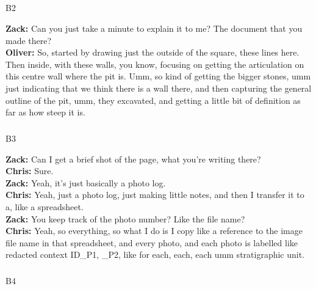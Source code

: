\documentclass[
]{article}
\makeatletter
\let\oldsubparagraph\subparagraph
\renewcommand{\subparagraph}{
    \@ifstar
      \xxxSubParagraphStar
      \xxxSubParagraphNoStar
  }
\newcommand{\xxxSubParagraphStar}[1]{\oldsubparagraph*{#1}\mbox{}}
\newcommand{\xxxSubParagraphNoStar}[1]{\oldsubparagraph{#1}\mbox{}}
\makeatother
\begin{document}
\subparagraph{B2}\label{sec-B2}

\textbf{Zack:} Can you just take a minute to explain it to me? The
document that you made there?\\
\textbf{Oliver:} So, started by drawing just the outside of the square,
these lines here. Then inside, with these walls, you know, focusing on
getting the articulation on this centre wall where the pit is. Umm, so
kind of getting the bigger stones, umm just indicating that we think
there is a wall there, and then capturing the general outline of the
pit, umm, they excavated, and getting a little bit of definition as far
as how steep it is.

\subparagraph{B3}\label{sec-B3}

\textbf{Zack:} Can I get a brief shot of the page, what you're writing
there?\\
\textbf{Chris:} Sure.\\
\textbf{Zack:} Yeah, it's just basically a photo log.\\
\textbf{Chris:} Yeah, just a photo log, just making little notes, and
then I transfer it to a, like a spreadsheet.\\
\textbf{Zack:} You keep track of the photo number? Like the file name?\\
\textbf{Chris:} Yeah, so everything, so what I do is I copy like a
reference to the image file name in that spreadsheet, and every photo,
and each photo is labelled like redacted context ID\_P1, \_P2, like for
each, each, each umm stratigraphic unit.

\subparagraph{B4}\label{sec-B4}
\end{document}
